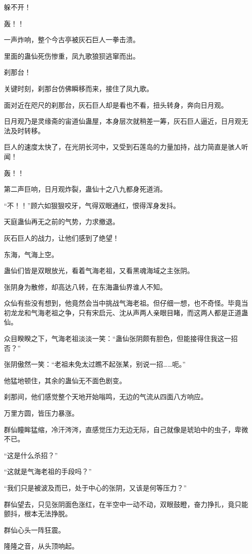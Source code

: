 \begin{this_body}
躲不开！

轰！！

一声炸响，整个今古亭被灰石巨人一拳击溃。

里面的蛊仙死伤惨重，凤九歌狼狈逃窜而出。

刹那台！

关键时刻，刹那台仿佛瞬移而来，接住了凤九歌。

面对近在咫尺的刹那台，灰石巨人却是看也不看，扭头转身，奔向日月观。

日月观乃是灵缘斋的宙道仙蛊屋，本身层次就稍差一筹，灰石巨人逼近，日月观无法及时转移。

巨人的速度太快了，在光阴长河中，又受到石莲岛的力量加持，战力简直是骇人听闻！

轰！！

第二声巨响，日月观炸裂，蛊仙十之八九都身死道消。

“不！！”顾六如狠狠咬牙，气得双眼通红，恨得浑身发抖。

天庭蛊仙再无之前的气势，力求撤退。

灰石巨人的战力，让他们感到了绝望！

东海，气海上空。

蛊仙们皆是双眼放光，看着气海老祖，又看黑魂海域之主张阴。

张阴身为散修，却高达八转，在东海蛊仙界谁人不知。

众仙有些没有想到，他竟然会当中挑战气海老祖。但仔细一想，也不奇怪。毕竟当初龙龙和气海老祖之争，只有宋启元、沈从声两人亲眼目睹，而这两人都是正道蛊仙。

众目睽睽之下，气海老祖淡淡一笑：“蛊仙张阴颇有胆色，但能接得住我这一招否？”

张阴傲然一笑：“老祖未免太过瞧不起张某，别说一招……呃。”

他猛地顿住，其余的蛊仙无不面色剧变。

刹那间，他们感觉整个天地开始嗡鸣，无边的气流从四面八方响应。

万里方圆，皆压力暴涨。

群仙瞳眸猛缩，冷汗涔涔，直感觉压力无边无际，自己就像是琥珀中的虫子，卑微不已。

“这是什么杀招？”

“这就是气海老祖的手段吗？”

“我们只是被波及而已，处于中心的张阴，又该是何等压力？”

群仙望去，只见张阴面色涨红，在半空中一动不动，双眼鼓瞪，奋力挣扎，竟只能颤抖，根本无法挣脱。

群仙心头一阵狂震。

隆隆之音，从头顶响起。


\end{this_body}
